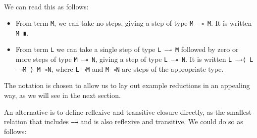 \begin{fence}
\begin{code}
%
\>[4]\AgdaSpace{}%
\AgdaSpace{}%
\AgdaSpace{}%
\<%
\\
%
\\[\AgdaEmptyExtraSkip]%
\>[0]\AgdaSpace{}%
\AgdaSymbol{:}\AgdaSpace{}%
\AgdaSpace{}%
\AgdaSymbol{\{}\AgdaSpace{}%
\AgdaSymbol{\}}\<%
\\
\>[0][@{}l@{\AgdaIndent{0}}]%
\>[2]%
\>[794I]\AgdaSpace{}%
\AgdaSpace{}%
\<%
\\
\>[.][@{}l@{}]\<[794I]%
\>[4]\AgdaComment{------}\<%
\\
%
\>[2]\AgdaSpace{}%
\AgdaSpace{}%
\AgdaSpace{}%
\<%
\\
\>[0]\AgdaSpace{}%
\AgdaSpace{}%
\AgdaSymbol{=}\AgdaSpace{}%
\<%
\end{code}
\end{fence}

We can read this as follows:

\begin{itemize}
\item
  From term \texttt{M}, we can take no steps, giving a step of type
  \texttt{M\ —↠\ M}. It is written \texttt{M\ ∎}.
\item
  From term \texttt{L} we can take a single step of type
  \texttt{L\ —→\ M} followed by zero or more steps of type
  \texttt{M\ —↠\ N}, giving a step of type \texttt{L\ —↠\ N}. It is
  written \texttt{L\ —→⟨\ L—→M\ ⟩\ M—↠N}, where \texttt{L—→M} and
  \texttt{M—↠N} are steps of the appropriate type.
\end{itemize}

The notation is chosen to allow us to lay out example reductions in an
appealing way, as we will see in the next section.

An alternative is to define reflexive and transitive closure directly,
as the smallest relation that includes \texttt{—→} and is also reflexive
and transitive. We could do so as follows:

